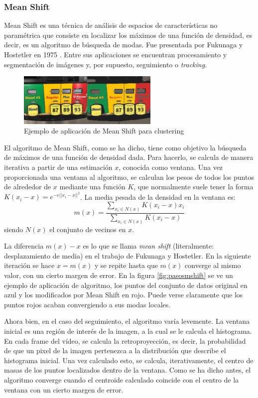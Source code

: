 \subsubsection*{Mean Shift}
Mean Shift es una técnica de análisis de espacios de características no paramétrica que consiste en localizar los máximos de una función de densidad, es decir, es un algoritmo de búsqueda de modas. Fue presentada por Fukunaga y Hostetler en 1975 \cite{1055330}. Entre sus aplicaciones se encuentran procesamiento y segmentación de imágenes y, por supuesto, seguimiento o \textit{tracking}.

\begin{figure}
    \centering
    \includegraphics[width=0.6\textwidth]{images/clustering}
    \caption{Ejemplo de aplicación de Mean Shift para clustering}
    \label{fig:clustering}
\end{figure}

El algoritmo de Mean Shift, como se ha dicho, tiene como objetivo la búsqueda de máximos de una función de densidad dada. Para hacerlo, se calcula de manera iterativa a partir de una estimación $x$, conocida como ventana. Una vez proporcionada una ventana al algoritmo, se calculan los pesos de todos los puntos de alrededor de $x$ mediante una función $K$, que normalmente suele tener la forma $K(x_i-x) = e^{-e||x_i-x||^2}$. La media pesada de la densidad en la ventana es:
\[
  m(x) = \frac{\sum_{x_i\in N(x)}K(x_i-x)x_i}{\sum_{x_i\in N(x)}K(x_i-x)}
\]
siendo $N(x)$ el conjunto de vecinos en $x$.

La diferencia $m(x)-x$ es lo que se llama \textit{mean shift} (literalmente: desplazamiento de media) en el trabajo de Fukunaga y Hostetler. En la siguiente iteración se hace $x= m(x)$ y se repite hasta que $m(x)$ converge al mismo valor, con un cierto margen de error. En la figura \ref{fig:pasosmshift} se ve un ejemplo de aplicación de algoritmo, los puntos del conjunto de datos original en azul y los modificados por Mean Shift en rojo. Puede verse claramente que los puntos rojos acaban convergiendo a sus modas locales.

Ahora bien, en el caso del seguimiento, el algoritmo varía levemente. La ventana inicial es una región de interés de la imagen, a la cual se le calcula el histograma. En cada frame del vídeo, se calcula la retroproyección, es decir, la probabilidad de que un pixel de la imagen pertenezca a la distribución que describe el histograma inicial. Una vez calculado esto, se calcula, iterativamente, el centro de masas de los puntos localizados dentro de la ventana. Como se ha dicho antes, el algoritmo converge cuando el centroide calculado coincide con el centro de la ventana con un cierto margen de error.

